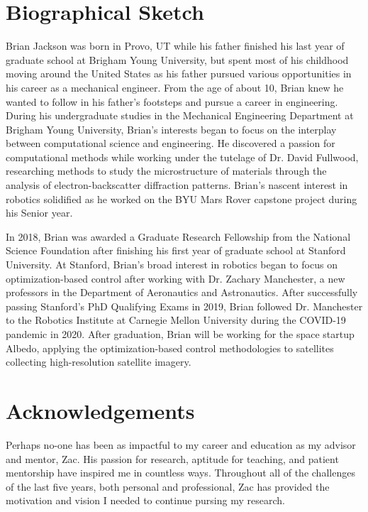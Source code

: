 \documentclass[10pt,oneside]{book}
\begin{document}
    \chapter*{Biographical Sketch}
    Brian Jackson was born in Provo, UT while his father finished his last year of graduate
    school at Brigham Young University, but spent most of his childhood moving around the 
    United States as his father pursued various opportunities in his career as a mechanical
    engineer. From the age of about 10, Brian knew he wanted to follow in his father's 
    footsteps and pursue a career in engineering. During his undergraduate studies in 
    the Mechanical Engineering Department at Brigham Young University, Brian's interests 
    began to focus on the interplay between computational science and engineering. He 
    discovered a passion for computational methods while working
    under the tutelage of Dr. David Fullwood, researching methods to study the 
    microstructure of materials through the analysis of electron-backscatter diffraction 
    patterns. Brian's nascent interest in robotics solidified as he worked on the BYU Mars 
    Rover capstone project during his Senior year.

    In 2018, Brian was awarded a Graduate Research Fellowship from the National Science 
    Foundation after finishing his first year of graduate school at Stanford University.
    At Stanford, Brian's broad interest in robotics began to focus on optimization-based 
    control after working with Dr. Zachary Manchester, a new professors in the Department of
    Aeronautics and Astronautics. After successfully passing Stanford's PhD 
    Qualifying Exams in 2019, Brian followed Dr. Manchester to the Robotics Institute at 
    Carnegie Mellon University during the COVID-19 pandemic in 2020. After graduation, Brian
    will be working for the space startup Albedo, applying the optimization-based control 
    methodologies to satellites collecting high-resolution satellite imagery.  

    \chapter*{Acknowledgements}
    Perhaps no-one has been as impactful to my career and education as my advisor and 
    mentor, Zac. His passion for research, aptitude for teaching, and patient mentorship 
    have inspired me in countless ways. Throughout all of the challenges of the last five 
    years, both personal and professional, Zac has provided the motivation and vision I 
    needed to continue pursing my research. 
\end{document}
